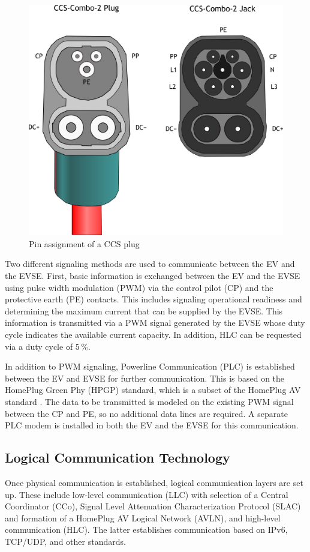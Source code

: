 \documentclass[sigconf]{acmart}
\begin{document}
\begin{figure}[ht]
    \centering
    \includegraphics[width=0.7\linewidth]{graphics/CCS-Combo-2.png}
    \caption{Pin assignment of a CCS plug \citep{Ajzh2074-CCS-Plug}}
    \label{fig:CCS-pinout}
\end{figure}

Two different signaling methods are used to communicate between the EV and the EVSE. First, basic information is exchanged between the EV and the EVSE using pulse width modulation (PWM) via the control pilot (CP) and the protective earth (PE) contacts. This includes signaling operational readiness and determining the maximum current that can be supplied by the EVSE. This information is transmitted via a PWM signal generated by the EVSE whose duty cycle indicates the available current capacity. In addition, HLC can be requested via a duty cycle of 5\,\%. \citep[pp.\,36--43]{bahrami-ev-2020}

In addition to PWM signaling, Powerline Communication (PLC) is established between the EV and EVSE for further communication. This is based on the HomePlug Green Phy (HPGP) standard, which is a subset of the HomePlug AV standard \citep[p.\,11]{homeplug-green-phy-whitepaper}. The data to be transmitted is modeled on the existing PWM signal between the CP and PE, so no additional data lines are required. A separate PLC modem is installed in both the EV and the EVSE for this communication.

\subsection{Logical Communication Technology}
Once physical communication is established, logical communication layers are set up. These include low-level communication (LLC) with selection of a Central Coordinator (CCo), Signal Level Attenuation Characterization Protocol (SLAC) and formation of a HomePlug AV Logical Network (AVLN), and high-level communication (HLC). The latter establishes communication based on IPv6, TCP/UDP, and other standards. \citep[p.\,49]{bahrami-ev-2020}
\end{document}
